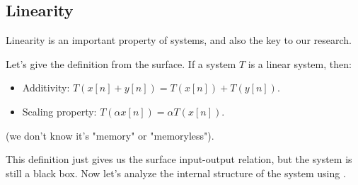     \subsection{Linearity}
        Linearity is an important property of systems, and also the key to our research.
        
        Let's give the definition from the surface.
        If a system $T$ is a linear system, then:
            \begin{itemize}
                \item Additivity: $T(x[n] + y[n]) = T(x[n]) + T(y[n])$.
                \item Scaling property: $T(\alpha x[n]) = \alpha T(x[n])$.
            \end{itemize}
        (we don't know it's "memory" or "memoryless").

        This definition just gives us the surface input-output relation, but the system is still a black box.
        Now let's analyze the internal structure of the system using .


